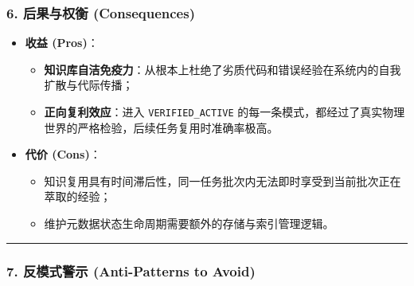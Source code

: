 \subsubsection{6. 后果与权衡
(Consequences)}\label{ux540eux679cux4e0eux6743ux8861-consequences-13}

\begin{itemize}
\tightlist
\item
  \textbf{收益 (Pros)}：

  \begin{itemize}
  \tightlist
  \item
    \textbf{知识库自洁免疫力}：从根本上杜绝了劣质代码和错误经验在系统内的自我扩散与代际传播；
  \item
    \textbf{正向复利效应}：进入 \texttt{VERIFIED\_ACTIVE}
    的每一条模式，都经过了真实物理世界的严格检验，后续任务复用时准确率极高。
  \end{itemize}
\item
  \textbf{代价 (Cons)}：

  \begin{itemize}
  \tightlist
  \item
    知识复用具有时间滞后性，同一任务批次内无法即时享受到当前批次正在萃取的经验；
  \item
    维护元数据状态生命周期需要额外的存储与索引管理逻辑。
  \end{itemize}
\end{itemize}

\begin{center}\rule{0.5\linewidth}{0.5pt}\end{center}

\subsubsection{7. 反模式警示 (Anti-Patterns to
Avoid)}\label{ux53cdux6a21ux5f0fux8b66ux793a-anti-patterns-to-avoid-13}


